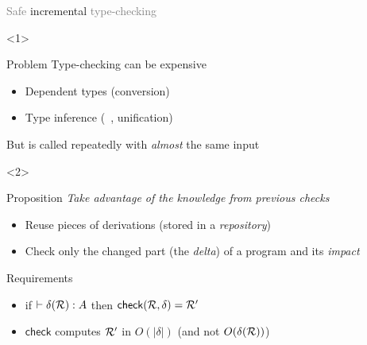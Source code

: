 \documentclass{beamer}
\theoremstyle{example}
\begin{document}
\begin{frame}{\textcolor{gray}{Safe} incremental
    \textcolor{gray}{type-checking}}


  \begin{onlyenv}<1>
    \begin{block}{Problem}
      Type-checking can be expensive
      \begin{example}
        \begin{itemize}
        \item Dependent types (conversion)
        \item Type inference (\eg\ , unification)
        \end{itemize}
      \end{example}
      But is called repeatedly with \emph{almost} the same input
    \end{block}
  \end{onlyenv}

  \begin{onlyenv}<2>
    \begin{block}{Proposition}
      \emph{Take advantage of the knowledge from previous checks}
      \begin{itemize}
      \item Reuse pieces of derivations (stored in a \emph{repository})
      \item Check only the changed part (the \emph{delta}) of a
        program and its \emph{impact}
      \end{itemize}

        \centering
    \end{block}

    \begin{block}{Requirements}
      \begin{itemize}
      \item if $\vdash \delta(\mathcal{R}) : A$ then ${\rm\mathsf{check}}({\mathcal{R},
          \delta}) = \mathcal{R'}$
      \item $\mathsf{check}$ computes $\mathcal{R'}$ in $O(|\delta|)$ \small\qquad\qquad (and not
        $O(\delta(\mathcal{R}))$)
      \end{itemize}
    \end{block}
  \end{onlyenv}

\end{frame}
\end{document}

